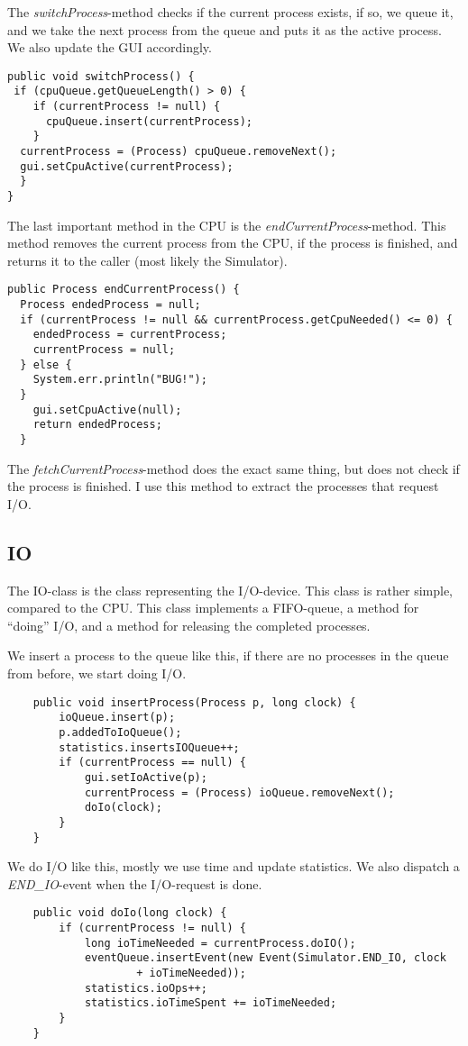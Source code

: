 \documentclass[norsk,a4paper]{article}
\begin{document}
The \emph{switchProcess}-method checks if the current process exists, if so, we
queue it, and we take the next process from the queue and puts it as the active
process. We also update the GUI accordingly.
\begin{lstlisting}
public void switchProcess() {
 if (cpuQueue.getQueueLength() > 0) {
    if (currentProcess != null) {
      cpuQueue.insert(currentProcess);
    }
  currentProcess = (Process) cpuQueue.removeNext();
  gui.setCpuActive(currentProcess);
  }
}
\end{lstlisting}

The last important method in the CPU is the \emph{endCurrentProcess}-method.
This method removes the current process from the CPU, if the process is
finished, and returns it to the caller (most likely the Simulator).
\begin{lstlisting}
public Process endCurrentProcess() {
  Process endedProcess = null;
  if (currentProcess != null && currentProcess.getCpuNeeded() <= 0) {
    endedProcess = currentProcess;
    currentProcess = null;
  } else {
    System.err.println("BUG!");
  }
    gui.setCpuActive(null);
    return endedProcess;
  }
\end{lstlisting}

The \emph{fetchCurrentProcess}-method does the exact same thing, but does not
check if the process is finished. I use this method to extract the processes
that request I/O.

\subsection{IO}
The IO-class is the class representing the I/O-device. This class is rather
simple, compared to the CPU. This class implements a FIFO-queue, a method for
``doing'' I/O, and a method for releasing the completed processes.

We insert a process to the queue like this, if there are no processes in the
queue from before, we start doing I/O.
\begin{lstlisting}
    public void insertProcess(Process p, long clock) {
        ioQueue.insert(p);
        p.addedToIoQueue();
        statistics.insertsIOQueue++;
        if (currentProcess == null) {
            gui.setIoActive(p);
            currentProcess = (Process) ioQueue.removeNext();
            doIo(clock);
        }
    }
\end{lstlisting}

We do I/O like this, mostly we use time and update statistics. We also dispatch
a \emph{END\_IO}-event when the I/O-request is done.
\begin{lstlisting}
    public void doIo(long clock) {
        if (currentProcess != null) {
            long ioTimeNeeded = currentProcess.doIO();
            eventQueue.insertEvent(new Event(Simulator.END_IO, clock
                    + ioTimeNeeded));
            statistics.ioOps++;
            statistics.ioTimeSpent += ioTimeNeeded;
        }
    }
\end{lstlisting}
\end{document}
